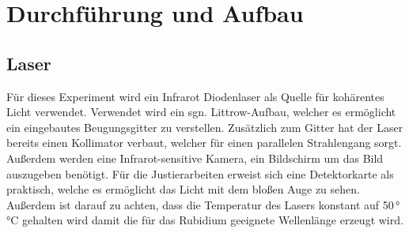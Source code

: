 \section{Durchführung und Aufbau}
\label{sec:Durchführung}

\subsection{Laser}
\label{sec:AufbLaser}
Für dieses Experiment wird ein Infrarot Diodenlaser als Quelle für kohärentes Licht verwendet. Verwendet wird ein sgn. Littrow-Aufbau, welcher es ermöglicht ein eingebautes Beugungsgitter
zu verstellen. Zusätzlich zum Gitter hat der Laser bereits einen Kollimator verbaut, welcher für einen parallelen Strahlengang sorgt.
Außerdem werden eine Infrarot-sensitive Kamera, ein Bildschirm um das Bild auszugeben benötigt. Für die Justierarbeiten erweist sich eine Detektorkarte als praktisch, welche es 
ermöglicht das Licht mit dem bloßen Auge zu sehen. Außerdem ist darauf zu achten, dass die Temperatur des Lasers konstant auf 50\,°\unit{\celsius} gehalten wird damit die für das Rubidium geeignete Wellenlänge erzeugt wird.


